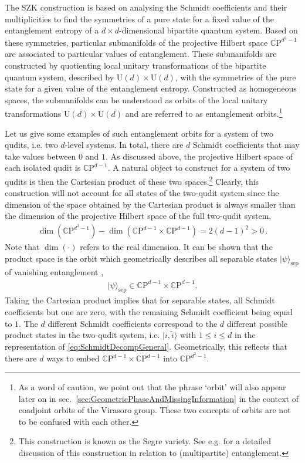 \documentclass[a4paper,11pt]{article}
\newcommand{\CP}[1]{\mathds{C}\text{P}^{#1}}
\newcommand{\U}{\text{U}}
\newcommand{\1}{\mathds{1}}
\begin{document}
The SZK construction \cite{Sinolecka2002manifolds} is based on analysing the Schmidt coefficients and their multiplicities to find the symmetries of a pure state for a fixed value of the entanglement entropy of a $d\times d$-dimensional bipartite quantum system. Based on these symmetries, particular submanifolds of the projective Hilbert space $\CP{d^2-1}$ are associated to particular values of entanglement. These submanifolds are constructed by quotienting  local unitary transformations of the bipartite quantum system, described by $\U(d)\times\U(d)$, with the symmetries of the pure state for a given value of the entanglement entropy. Constructed as homogeneous spaces, the submanifolds can be understood as orbits of the local unitary transformations $\U(d)\times\U(d)$ and are referred to as entanglement orbits.\footnote{As a word of caution, we point out that the phrase `orbit' will also appear later on in sec.~\ref{sec:GeometricPhaseAndMissingInformation} in the context of coadjoint orbits of the Virasoro group. These two concepts of orbits are not to be confused with each other.}

Let us give some examples of such entanglement orbits for a system of two qudits, i.e. two $d$-level systems. In total, there are $d$ Schmidt coefficients that may take values between $0$ and $1$. As discussed above, the projective Hilbert space of each isolated qudit is $\CP{d-1}$. A natural object to construct for a system of two qudits is then the Cartesian product of these two spaces.\footnote{This construction is known as the Segre variety. See e.g. \cite{miyake2003classification,bengtsson2017geometry} for a detailed discussion of this construction in relation to (multipartite) entanglement.} Clearly, this construction will not account for all states of the two-qudit system since the dimension of the space obtained by the Cartesian product is always smaller than the dimension of the projective Hilbert space of the full two-qudit system,
\begin{align}
    \dim(\CP{d^2-1})-\dim(\CP{d-1}\times\CP{d-1})=2(d-1)^2>0\,.
\end{align}
Note that $\dim(\cdot)$ refers to the real dimension. It can be shown that the product space is the orbit which geometrically describes all separable states $|\psi\rangle_{\text{sep}}$ of vanishing entanglement \cite{Sinolecka2002manifolds},
\begin{align}
    |\psi\rangle_{\text{sep}}\in\CP{d-1}\times\CP{d-1}.\label{eq:OrbitVanEnt}
\end{align}
Taking the Cartesian product implies that for separable states, all Schmidt coefficients but one are zero, with the remaining Schmidt coefficient being equal to  $1$. The $d$ different Schmidt coefficients  correspond to the $d$ different possible product states in the two-qudit system, i.e. $|i,\tilde{i}\rangle$ with $1\leq i\leq d$ in the representation of \eqref{eq:SchmidtDecompGeneral}. Geometrically, this reflects that there are $d$ ways to embed $\CP{d-1}\times\CP{d-1}$ into $\CP{d^2-1}$.
\end{document}

